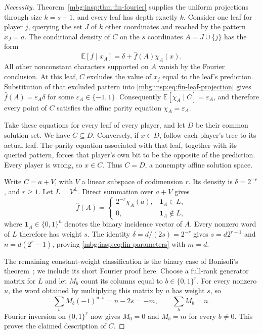 \documentclass[11pt,letterpaper]{article}
\theoremstyle{definition}
\newcommand{\E}{\mathbb E}
\begin{document}
\begin{proof}[Necessity]
Theorem~\ref{mbg:insp:thm:fin-fourier} supplies the uniform projections through
size $k=s-1$, and every leaf has depth exactly $k$.
Consider one leaf for player $j$, querying the set $J$ of $k$ other
coordinates and reached by the pattern $x_J=a$.  The conditional
density of $C$ on the $s$ coordinates $A=J\cup\{j\}$ has the form
\begin{equation}
 \E[f\mid x_A]=\delta+\widehat f(A)\chi_A(x).
 \label{mbg:insp:eq:fin-leaf-projection}
\end{equation}
All other nonconstant characters supported on $A$ vanish by the
Fourier conclusion.  At this leaf, $C$ excludes the value of $x_j$
equal to the leaf's prediction.  Substitution of that excluded pattern
into \eqref{mbg:insp:eq:fin-leaf-projection} gives
$\widehat f(A)=\varepsilon_A\delta$ for some
$\varepsilon_A\in\{-1,1\}$.  Consequently
$\E[\chi_A\mid C]=\varepsilon_A$, and therefore every point of $C$
satisfies the affine parity equation $\chi_A=\varepsilon_A$.

Take these equations for every leaf of every player, and let $D$ be
their common solution set.  We have $C\subseteq D$.  Conversely, if
$x\in D$, follow each player's tree to its actual leaf.  The parity
equation associated with that leaf, together with its queried pattern,
forces that player's own bit to be the opposite of the prediction.
Every player is wrong, so $x\in C$.  Thus $C=D$, a nonempty affine
solution space.

Write $C=a+V$, with $V$ a linear subspace of codimension $r$.
Its density is $\delta=2^{-r}$, and $r\geq1$.  Let
$L=V^\perp$.  Direct summation over $a+V$ gives
\[
 \widehat f(A)=
 \begin{cases}
  2^{-r}\chi_A(a),&\mathbf 1_A\in L,\\
  0,&\mathbf 1_A\notin L,
 \end{cases}
\]
where $\mathbf 1_A\in\{0,1\}^n$ denotes the binary incidence vector of $A$.
Every nonzero word of $L$ therefore has weight $s$.
The identity $\delta=d/(2s)=2^{-r}$ gives
$s=d2^{r-1}$ and $n=d(2^r-1)$, proving
\eqref{mbg:insp:eq:fin-parameters} with $m=d$.

The remaining constant-weight classification is the binary case of
Bonisoli's theorem~\cite{insp:Bonisoli}; we include its short Fourier proof
here.  Choose a full-rank generator matrix for $L$ and let
$M_b$ count its columns equal to $b\in\{0,1\}^r$.  For every nonzero
$u$, the word obtained by multiplying this matrix by $u$ has weight
$s$, so
\[
 \sum_b M_b(-1)^{u\cdot b}=n-2s=-m,
 \qquad \sum_b M_b=n.
\]
Fourier inversion on $\{0,1\}^r$ now gives $M_0=0$ and
$M_b=m$ for every $b\ne0$.  This proves the claimed description of $C$.
\end{proof}
\end{document}
